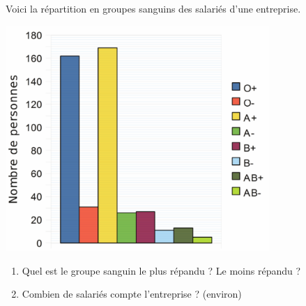 
\begin{rituel}

Voici la répartition en groupes sanguins des salariés d'une entreprise.

\includegraphics[width=10cm]{histoOplus.pdf}


\begin{enumerate}
    \item
        Quel est le groupe sanguin le plus répandu ? Le moins répandu ?
    \item
        Combien de salariés compte l'entreprise ? (environ)
\end{enumerate}

\end{rituel}
